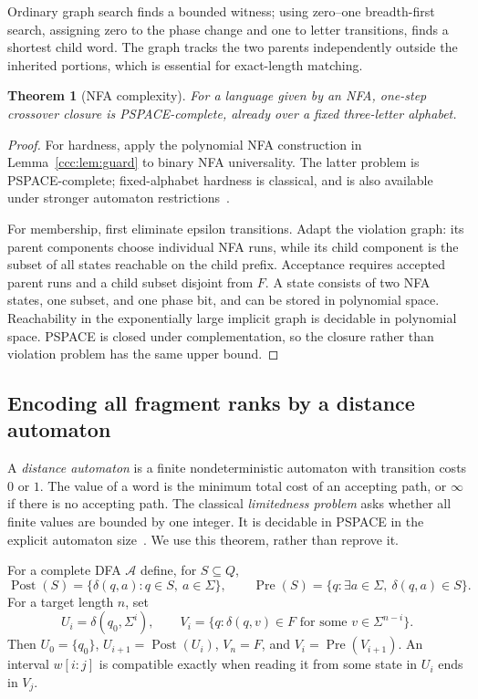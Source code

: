\documentclass[11pt,letterpaper]{article}
\newtheorem{theorem}{Theorem}[section]
\theoremstyle{definition}
\theoremstyle{remark}
\newcommand{\Post}{\operatorname{Post}}
\newcommand{\Pre}{\operatorname{Pre}}
\begin{document}
Ordinary graph search finds a bounded witness; using zero--one breadth-first
search, assigning zero to the phase change and one to letter transitions,
finds a shortest child word. The graph tracks the two parents independently
outside the inherited portions, which is essential for exact-length matching.

\begin{theorem}[NFA complexity]\label{ccc:thm:nfa}
For a language given by an NFA, one-step crossover closure is PSPACE-complete,
already over a fixed three-letter alphabet.
\end{theorem}
\begin{proof}
For hardness, apply the polynomial NFA construction in
Lemma~\ref{ccc:lem:guard} to binary NFA universality. The latter problem is
PSPACE-complete; fixed-alphabet hardness is classical, and is also available
under stronger automaton restrictions~\cite{KMT}.

For membership, first eliminate epsilon transitions. Adapt the violation
graph: its parent components choose individual NFA runs, while its child
component is the subset of all states reachable on the child prefix.
Acceptance requires accepted parent runs and a child subset disjoint from
$F$. A state consists of two NFA states, one subset, and one phase bit, and
can be stored in polynomial space. Reachability in the exponentially large
implicit graph is decidable in polynomial space. PSPACE is closed under
complementation, so the closure rather than violation problem has the same
upper bound.
\end{proof}

\subsection{Encoding all fragment ranks by a distance automaton}

A \emph{distance automaton} is a finite nondeterministic automaton with
transition costs $0$ or $1$. The value of a word is the minimum total cost
of an accepting path, or $\infty$ if there is no accepting path.
The classical \emph{limitedness problem} asks whether all finite values are
bounded by one integer. It is decidable in PSPACE in the explicit automaton
size~\cite{Kirsten}. We use this theorem, rather than reprove it.

For a complete DFA $\mathcal A$ define, for $S\subseteq Q$,
\[
 \Post(S)=\{\delta(q,a):q\in S,\ a\in\Sigma\},\qquad
 \Pre(S)=\{q:\exists a\in\Sigma,\ \delta(q,a)\in S\}.
\]
For a target length $n$, set
\[
 U_i=\delta(q_0,\Sigma^i),\qquad
 V_i=\{q:\delta(q,v)\in F\text{ for some }v\in\Sigma^{n-i}\}.
\]
Then $U_0=\{q_0\}$, $U_{i+1}=\Post(U_i)$, $V_n=F$, and
$V_i=\Pre(V_{i+1})$. An interval $w[i:j]$ is compatible exactly when reading
it from some state in $U_i$ ends in $V_j$.
\end{document}
